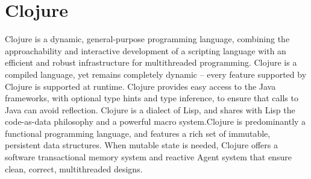 \section{Clojure}

Clojure\cite {Clojure} is a dynamic, general-purpose programming language,
combining the approachability and interactive development of a 
scripting language with an efficient and robust infrastructure for multithreaded
programming. Clojure is a compiled language, yet remains completely dynamic –
every feature supported by Clojure is supported at runtime. Clojure provides
easy access to the Java frameworks, with optional type hints and type inference,
to ensure that calls to Java can avoid reflection.  Clojure is a dialect of
 Lisp, and shares with Lisp the code-as-data philosophy and a
powerful macro system.Clojure is predominantly a functional programming
language, and features a rich set of immutable, persistent data structures. When
mutable state is needed, Clojure offers a software transactional memory system
and reactive Agent system that ensure clean, correct, multithreaded
designs\cite{Wiki_Clojure}.
